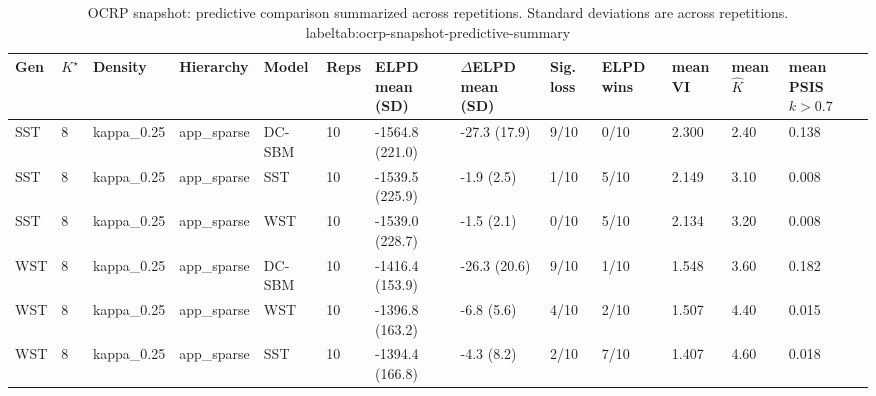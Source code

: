 \begin{table}[!h]
\centering
\caption{OCRP snapshot: predictive comparison summarized across repetitions. Standard deviations are across repetitions.\\label{tab:ocrp-snapshot-predictive-summary}}
\centering
\begin{tabular}[t]{lllllllllllll}
\toprule
Gen & $K^\star$ & Density & Hierarchy & Model & Reps & ELPD mean (SD) & $\Delta$ELPD mean (SD) & Sig. loss & ELPD wins & mean VI & mean $\hat K$ & mean PSIS $k>0.7$\\
\midrule
SST & 8 & kappa_0.25 & app_sparse & DC-SBM & 10 & -1564.8 (221.0) & -27.3 (17.9) & 9/10 & 0/10 & 2.300 & 2.40 & 0.138\\
SST & 8 & kappa_0.25 & app_sparse & SST & 10 & -1539.5 (225.9) & -1.9 (2.5) & 1/10 & 5/10 & 2.149 & 3.10 & 0.008\\
SST & 8 & kappa_0.25 & app_sparse & WST & 10 & -1539.0 (228.7) & -1.5 (2.1) & 0/10 & 5/10 & 2.134 & 3.20 & 0.008\\
WST & 8 & kappa_0.25 & app_sparse & DC-SBM & 10 & -1416.4 (153.9) & -26.3 (20.6) & 9/10 & 1/10 & 1.548 & 3.60 & 0.182\\
WST & 8 & kappa_0.25 & app_sparse & WST & 10 & -1396.8 (163.2) & -6.8 (5.6) & 4/10 & 2/10 & 1.507 & 4.40 & 0.015\\
WST & 8 & kappa_0.25 & app_sparse & SST & 10 & -1394.4 (166.8) & -4.3 (8.2) & 2/10 & 7/10 & 1.407 & 4.60 & 0.018\\
\bottomrule
\end{tabular}
\end{table}
